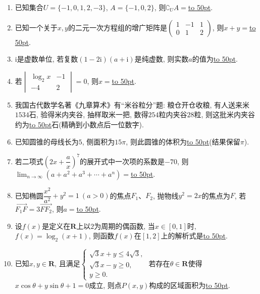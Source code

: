 \documentclass[10pt,a4paper]{article}
\newcommand{\blank}[1]{\underline{\hbox to #1pt{}}}
\begin{document}
\begin{enumerate}[1.]
\item 已知集合$U=\{-1,0,1,2,-3\}$, $A=\{-1,0,2\}$, 则$\complement_U A=$\blank{50}.
\item 已知一个关于$x,y$的二元一次方程组的增广矩阵是$\begin{pmatrix} 1 & -1 & 1  \\ 0 & 1 & 2 \end{pmatrix}$, 则$x+y=$\blank{50}.
\item $\mathrm{i}$是虚数单位, 若复数$(1-2\mathrm{i})(a+\mathrm{i})$是纯虚数, 则实数$a$的值为\blank{50}.
\item 若$\begin{vmatrix} \log_2 x & -1  \\ -4 & 2  \end{vmatrix}=0$, 则$x=$\blank{50}.
\item 我国古代数学名著《九章算术》有``米谷粒分''题: 粮仓开仓收粮, 有人送来米$1534$石, 验得米内夹谷, 抽样取米一把, 数得$254$粒内夹谷$28$粒, 则这批米内夹谷约为\blank{50}石(精确到小数点后一位数字).
\item 已知圆锥的母线长为$5$, 侧面积为$15\pi$, 则此圆锥的体积为\blank{50}(结果保留$\pi$).
\item 若二项式$(2x+\dfrac ax)^7$的展开式中一次项的系数是$-70$, 则$\displaystyle\lim_{n\to\infty}(a+a^2+a^3+\cdots+a^n)=$\blank{50}.
\item 已知椭圆$\dfrac{x^2}{a^2}+y^2=1 \ (a>0)$的焦点$F_1$、$F_2$, 抛物线${y^2}=2x$的焦点为$F$, 若$\overrightarrow{F_1F}=3 \overrightarrow{FF_2}$, 则$a=$\blank{50}.
\item 设$f(x)$是定义在$\mathbf{R}$上以$2$为周期的偶函数, 当$x\in [0,1]$时, $f(x)=\log_2(x+1)$, 则函数$f(x)$在$[1,2]$上的解析式是\blank{50}.
\item 已知$x,y\in \mathbf{R}$, 且满足$\begin{cases} \sqrt3x+y\le 4 \sqrt3, \\  \sqrt3x-y\ge 0,\\ y\ge 0. \end{cases}$ 若存在$\theta \in \mathbf{R}$使得$x\cos \theta +y\sin \theta +1=0$成立, 则点$P(x,y)$构成的区域面积为\blank{50}.



\end{enumerate}
\end{document}
